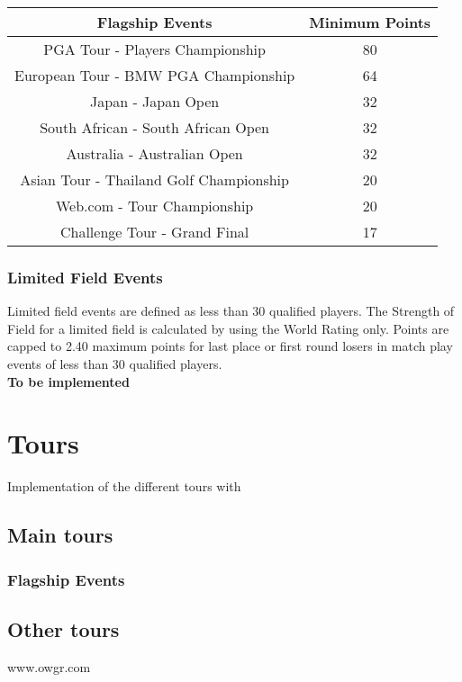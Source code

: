\documentclass{article}
\begin{document}
\begin{center}
\begin{tabular}{ | c | c | }
\hline
Flagship Events	&Minimum Points\\
\hline
PGA Tour - Players Championship	&80\\
European Tour - BMW PGA Championship&	64\\
Japan - Japan Open	&32\\
South African - South African Open	&32\\
Australia - Australian Open	&32\\
Asian Tour - Thailand Golf Championship	&20\\
Web.com - Tour Championship	&20\\
Challenge Tour - Grand Final	&17\\
\hline
\end{tabular}
\end{center}

\subsubsection{Limited Field Events}

Limited field events are defined as less than 30 qualified players. The Strength of Field for a limited field is calculated by using the World Rating only. Points are capped to 2.40 maximum points for last place or first round losers in match play events of less than 30 qualified players.\\
\textbf{\color{orange} To be implemented}

\section{Tours}

Implementation of the different tours with

\subsection{Main tours}
\subsubsection{Flagship Events}
\subsection{Other tours}


\begin{thebibliography}{9}
	 www.owgr.com%
\end{thebibliography}
\end{document}
